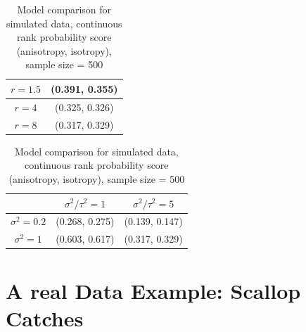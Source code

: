 \documentclass[12pt,twoside]{dukestatscithesis}
\theoremstyle{definition}
\theoremstyle{definition}
\theoremstyle{definition}
\theoremstyle{remark}
\begin{document}
\begin{table}[H]
\centering
\setlength{\extrarowheight}{10pt}
\hspace*{-1.5cm}
\begin{tabular}{|c|c|}
\hline
$r = 1.5$ & (0.391, 0.355) \\[5pt]
\hline
$r = 4$ & (0.325, 0.326) \\[5pt]
\hline
$r = 8$ & (0.317, 0.329) \\[5pt]
\hline
\end{tabular}
\quad
\begin{tabular}{|c|c|c|}
\hline
 & $\sigma^2/\tau^2 = 1 $ & $\sigma^2/\tau^2 = 5$\\[8pt]
\hline
$\sigma^2 = 0.2$ & (0.268, 0.275) & (0.139, 0.147)\\[8pt]
\hline
$\sigma^2 = 1$ & (0.603, 0.617) & (0.317, 0.329)  \\[8pt]
\hline
\end{tabular}
\hspace*{-1.5cm}
\caption{Model comparison for simulated data, continuous rank probability score (anisotropy, isotropy), sample size = 500}
\end{table}
\chapter{A real Data Example: Scallop
Catches}\label{a-real-data-example-scallop-catches}
\end{document}
